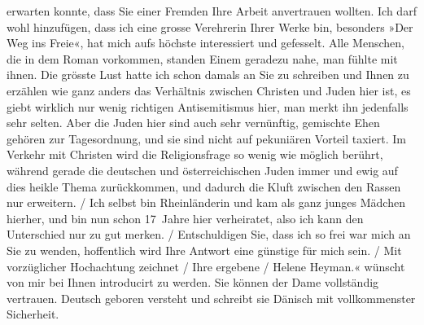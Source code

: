 \begin{ledgroupsized}[t]{13cm}
{{{                        erwarten konnte, dass Sie einer Fremden Ihre Arbeit anvertrauen wollten.
                        {\pb}Ich darf wohl hinzufügen, dass ich eine grosse Verehrerin Ihrer Werke
                        bin, besonders »Der Weg ins Freie«, hat
                        mich aufs höchste interessiert und gefesselt. Alle Menschen, die in dem
                        Roman vorkommen, standen Einem geradezu nahe, man fühlte mit ihnen. Die
                        grösste Lust hatte ich schon damals an Sie zu schreiben und Ihnen zu
                        erzählen wie ganz anders das Verhältnis zwischen Christen und Juden hier
                        ist, es giebt wirklich nur wenig richtigen Antisemitismus hier, man merkt
                        ihn jedenfalls sehr selten. Aber die Juden hier sind auch sehr
                        ver{\pb}nünftig, gemischte Ehen gehören zur Tagesordnung, und sie sind nicht
                        auf pekuniären Vorteil taxiert. Im Verkehr mit Christen wird die
                        Religionsfrage so wenig wie möglich berührt, während gerade die deutschen und österreichischen Juden immer und ewig auf dies heikle Thema
                        zurückkommen, und dadurch die Kluft zwischen den Rassen nur erweitern.{ / }Ich selbst bin Rheinländerin und kam als ganz junges Mädchen hierher, und bin nun
                        schon 17 Jahre hier verheiratet, also ich kann den Unterschied nur {\pb}zu
                        gut merken.{ / }Entschuldigen Sie, dass ich so frei war mich an Sie zu wenden, hoffentlich
                        wird Ihre Antwort eine günstige für mich sein.{ / }Mit vorzüglicher Hochachtung zeichnet{ / }Ihre ergebene{ / }Helene Heyman.«}}}\label{K_L02049_1h} wünscht von mir bei Ihnen introducirt zu werden. Sie können der
               Dame vollständig vertrauen. Deutsch geboren versteht und schreibt sie Dänisch mit vollkommenster Sicherheit.\pend
           \endnumbering{}\end{ledgroupsized}  \newcommand{\dateiname}{L02049}\newcommand{\titel}{Georg Brandes an Arthur Schnitzler, vor dem 2. 12. 1911}\newcommand{\editorInnen}{Martin Anton Müller und Gerd-Hermann Susen}
            \footnotesize
\begin{ledgroupsized}[t]{11.5cm}
\end{ledgroupsized}
         
      
